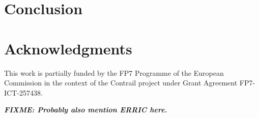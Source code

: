 \documentclass[10pt,twocolumn]{article}
\newcommand{\fixme}[1]
{
  \noindent
  \begin{boxedminipage}{\linewidth}
    \textsl{{\bf FIXME: #1}}
  \end{boxedminipage}
}
\begin{document}


\section{Conclusion}




\section{Acknowledgments}

This work is partially funded by the FP7 Programme of the European
Commission in the context of the Contrail project under Grant
Agreement FP7-ICT-257438.

\fixme{Probably also mention ERRIC here.}




\end{document}
